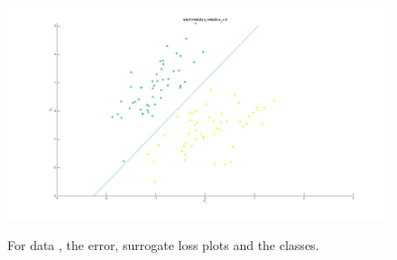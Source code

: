 \documentclass[a4paper, 11pt]{article}
\begin{document}
\begin{enumerate}[(a)]
\begin{figure}
{    \includegraphics[scale=0.25]{logistic2.jpg}
}
\caption[Scatter]{For data , the error, surrogate loss plots and the classes.}
\label{fig:logisticxa}
\end{figure}


\end{enumerate}
\end{document}
